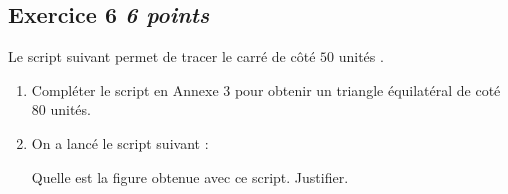 \documentclass[10pt]{article}
\begin{document}
\newpage

\subsection*{Exercice 6 \hfill \textit{6 points}}

Le script suivant permet de tracer le carré de côté $50$ unités .
\begin{center}
    \begin{scratch}
        {
        }
    \end{scratch}
\end{center}


\begin{enumerate}
\item Compléter le script en Annexe 3 pour obtenir un triangle équilatéral de coté $80$ unités.
    
\item On a lancé le script suivant :

\begin{center}
    \begin{scratch}
        {
        }
    \end{scratch}
\end{center}

Quelle est la figure obtenue avec ce script. Justifier.

\end{enumerate}
\end{document}
